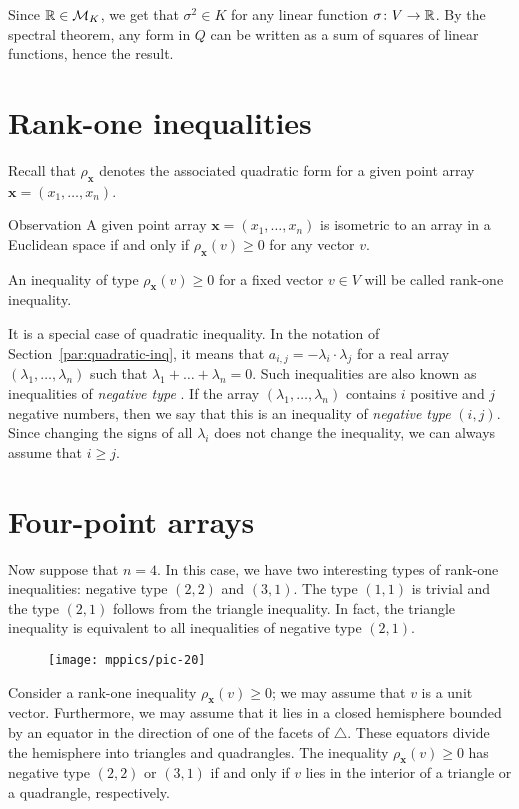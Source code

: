 \documentclass[a4paper,10pt]{article}
\begin{document}
Since $\mathbb{R}\in \mathcal{M}_K$, we get that $\sigma^2\in K$ for any linear function $\sigma\colon V\to\mathbb{R}$.
By the spectral theorem, any form in $Q$ can be written as a sum of squares of linear functions, hence the result.
\qeds

\section{Rank-one inequalities}\label{par:rank-one}
Recall that $\rho_{\bm{x}}$ denotes the associated quadratic form for a given point array $\bm{x}=(x_1,\dots,x_n)$.

\begin{thm}{Observation}\label{obs:rank-one}
A given point array $\bm{x}=(x_1,\dots,x_n)$ is isometric to an array in a Euclidean space if and only if $\rho_{\bm{x}}(v)\ge 0$ for any vector $v$.
\end{thm}

An inequality of type $\rho_{\bm{x}}(v)\ge 0$ for a fixed vector $v\in V$ will be called rank-one inequality.

It is a special case of quadratic inequality.
In the notation of Section~\ref{par:quadratic-inq}, it means that $a_{i,j}=-\lambda_i\cdot\lambda_j$ for a real array $(\lambda_1,\dots, \lambda_n)$ such that
$\lambda_1+\dots+\lambda_n=0$.
Such inequalities are also known as inequalities of \emph{negative type} \cite{deza-lauren}.
If the array $(\lambda_1,\dots, \lambda_n)$ contains $i$ positive and $j$ negative numbers,
then we say that this is an inequality of \emph{negative type} $(i,j)$.
Since changing the signs of all $\lambda_i$ does not change the inequality, we can always assume that $i\ge j$.

\section{Four-point arrays}\label{Four-point arrays}
Now suppose that $n=4$.
In this case, we have two interesting types of rank-one inequalities: negative type $(2,2)$ and $(3,1)$.
The type $(1,1)$ is trivial and
the type $(2,1)$ follows from the triangle inequality.
In fact, the triangle inequality is equivalent to all inequalities of negative type $(2,1)$.

\begin{wrapfigure}{o}{36mm}
\centering
\vskip-4mm
\texttt{[image: mppics/pic-20]}
\vskip-0mm
\end{wrapfigure}

Consider a rank-one inequality $\rho_{\bm{x}}(v)\ge 0$; we may assume that $v$ is a unit vector.
Furthermore, we may assume that it lies in a closed hemisphere bounded by an equator in the direction of one of the facets of $\triangle$.
These equators divide the hemisphere into triangles and quadrangles.
The inequality $\rho_{\bm{x}}(v)\ge 0$ has negative type $(2,2)$ or $(3,1)$
if and only if $v$ lies in the interior of a triangle or a quadrangle, respectively.
\end{document}
